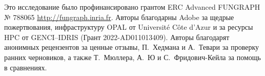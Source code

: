 \documentclass[acmtog]{acmart}
\begin{document}









\begin{acks}
Это исследование было профинансировано грантом ERC Advanced FUNGRAPH № 788065 \textcolor{blue}{\url{http://fungraph.inria.fr}}. Авторы благодарны Adobe за щедрые пожертвования, инфраструктуру OPAL от Université Côte d’Azur и за ресурсы HPC от GENCI–IDRIS (Грант 2022-AD011013409). Авторы благодарят анонимных рецензентов за ценные отзывы, П.\ Хедмана и А.\ Тевари за проверку ранних черновиков, а также Т.\ Мюллера, А.\ Ю и С.\ Фридович-Кейла за помощь в сравнениях. 
\end{acks}





\end{document}
